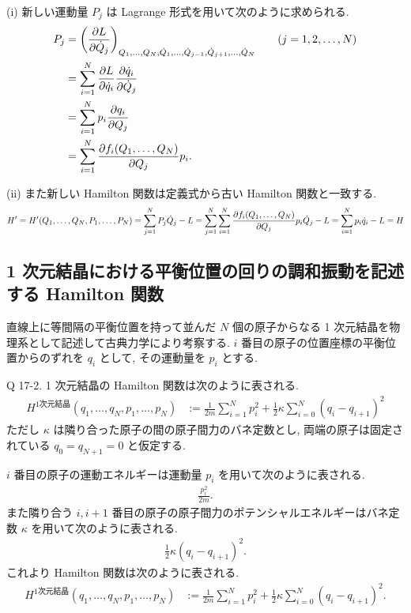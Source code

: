 \documentclass[uplatex,dvipdfmx,a4paper,11pt]{jlreq}
\theoremstyle{definition}
\begin{document}
(i) 新しい運動量 $P_j$ は Lagrange 形式を用いて次のように求められる.
\begin{align}
  P_j & = \qty(\pdv{L}{\dot{Q}_j})_{Q_1,\ldots,Q_N,\dot{Q}_1,\ldots,\dot{Q}_{j-1},\dot{Q}_{j+1},\ldots,\dot{Q}_N} \qquad (j=1,2,\ldots,N) \\
      & = \sum_{i=1}^{N}\pdv{L}{\dot{q}_i}\pdv{\dot{q}_i}{\dot{Q}_j}                                                                      \\
      & = \sum_{i=1}^{N}p_i\pdv{q_i}{Q_j}                                                                                                 \\
      & = \sum_{i=1}^{N}\pdv{f_i(Q_1,\ldots,Q_N)}{Q_j}p_i.
\end{align}

(ii) また新しい Hamilton 関数は定義式から古い Hamilton 関数と一致する.
\begin{align}
  H' = H'(Q_1,\ldots,Q_N,P_1,\ldots,P_N) = \sum_{j=1}^{N}P_j\dot{Q}_j - L = \sum_{j=1}^{N}\sum_{i=1}^{N}\pdv{f_i(Q_1,\ldots,Q_N)}{Q_j}p_i\dot{Q}_j - L = \sum_{i=1}^{N}p_i\dot{q}_i - L = H
\end{align}

\subsection{1 次元結晶における平衡位置の回りの調和振動を記述する Hamilton 関数}
直線上に等間隔の平衡位置を持って並んだ $N$ 個の原子からなる 1 次元結晶を物理系として記述して古典力学により考察する. $i$ 番目の原子の位置座標の平衡位置からのずれを $q_i$ として, その運動量を $p_i$ とする.
\begin{itembox}[l]{Q 17-2.}
  1 次元結晶の Hamilton 関数は次のように表される.
  \begin{align}
    H^{1次元結晶}(q_1,\ldots,q_N, p_1,\ldots,p_N) & := \frac{1}{2m}\sum_{i=1}^{N}p_i^2 + \frac{1}{2}\kappa\sum_{i=0}^{N}(q_i - q_{i+1})^2
  \end{align}
  ただし $\kappa$ は隣り合った原子の間の原子間力のバネ定数とし, 両端の原子は固定されている $q_0 = q_{N+1} = 0$ と仮定する.
\end{itembox}

$i$ 番目の原子の運動エネルギーは運動量 $p_i$ を用いて次のように表される.
\begin{align}
  \frac{p_i^2}{2m}.
\end{align}
また隣り合う $i, i+1$ 番目の原子の原子間力のポテンシャルエネルギーはバネ定数 $\kappa$ を用いて次のように表される.
\begin{align}
  \frac{1}{2}\kappa(q_i - q_{i+1})^2.
\end{align}
これより Hamilton 関数は次のように表される.
\begin{align}
  H^{1次元結晶}(q_1,\ldots,q_N, p_1,\ldots,p_N) & := \frac{1}{2m}\sum_{i=1}^{N}p_i^2 + \frac{1}{2}\kappa\sum_{i=0}^{N}(q_i - q_{i+1})^2.
\end{align}
\end{document}
